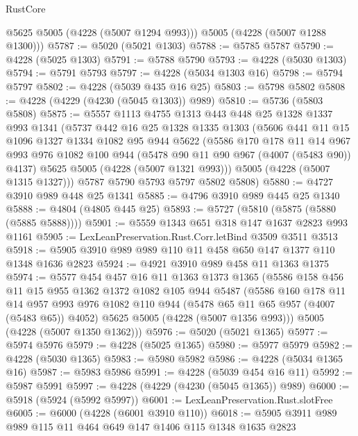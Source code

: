 \begin{lexlean}{RustCore}
\begin{coremodule}
        @5625
        @5005
        (@4228 (@5007 @1294 @993)))
      @5005
      (@4228 (@5007 @1288 @1300)))
@5787 := @5020 (@5021 @1303)
@5788 := @5785 @5787
@5790 := @4228 (@5025 @1303)
@5791 := @5788 @5790
@5793 := @4228 (@5030 @1303)
@5794 := @5791 @5793
@5797 := @4228 (@5034 @1303 @16)
@5798 := @5794 @5797
@5802 := @4228 (@5039 @435 @16 @25)
@5803 := @5798 @5802
@5808 := @4228 (@4229 (@4230 (@5045 @1303)) @989)
@5810 := @5736 (@5803 @5808)
@5875 := @5557
    @1113
    @4755
    @1313
    @443
    @448
    @25
    @1328
    @1337
    @993
    @1341
    (@5737
      @442
      @16
      @25
      @1328
      @1335
      @1303
      (@5606
        @441
        @11
        @15
        @1096
        @1327
        @1334
        @1082
        @95
        @944
        @5622
        (@5586
          @170
          @178
          @11
          @14
          @967
          @993
          @976
          @1082
          @100
          @944
          (@5478 @90 @11 @90 @967 (@4007 (@5483 @90)) @4137)
          @5625
          @5005
          (@4228 (@5007 @1321 @993)))
        @5005
        (@4228 (@5007 @1315 @1327)))
      @5787
      @5790
      @5793
      @5797
      @5802
      @5808)
@5880 := @4727 @3910 @989 @448 @25 @1341
@5885 := @4796 @3910 @989 @445 @25 @1340
@5888 := @4804 (@4805 @445 @25)
@5893 := @5727 (@5810 (@5875 (@5880 (@5885 @5888))))
@5901 := @5559 @1343 @651 @318 @147 @1637 @2823 @993 @1161
@5905 := LexLeanPreservation.Rust.Corr.letBind @3509 @3511 @3513
@5918 := @5905 @3910 @989 @989 @110 @11 @458 @650 @147 @1377 @110 @1348 @1636 @2823
@5924 := @4921 @3910 @989 @458 @11 @1363 @1375
@5974 := @5577
    @454
    @457
    @16
    @11
    @1363
    @1373
    @1365
    (@5586
      @158
      @456
      @11
      @15
      @955
      @1362
      @1372
      @1082
      @105
      @944
      @5487
      (@5586
        @160
        @178
        @11
        @14
        @957
        @993
        @976
        @1082
        @110
        @944
        (@5478 @65 @11 @65 @957 (@4007 (@5483 @65)) @4052)
        @5625
        @5005
        (@4228 (@5007 @1356 @993)))
      @5005
      (@4228 (@5007 @1350 @1362)))
@5976 := @5020 (@5021 @1365)
@5977 := @5974 @5976
@5979 := @4228 (@5025 @1365)
@5980 := @5977 @5979
@5982 := @4228 (@5030 @1365)
@5983 := @5980 @5982
@5986 := @4228 (@5034 @1365 @16)
@5987 := @5983 @5986
@5991 := @4228 (@5039 @454 @16 @11)
@5992 := @5987 @5991
@5997 := @4228 (@4229 (@4230 (@5045 @1365)) @989)
@6000 := @5918 (@5924 (@5992 @5997))
@6001 := LexLeanPreservation.Rust.slotFree
@6005 := @6000 (@4228 (@6001 @3910 @110))
@6018 := @5905 @3911 @989 @989 @115 @11 @464 @649 @147 @1406 @115 @1348 @1635 @2823

\end{coremodule}
\end{lexlean}
